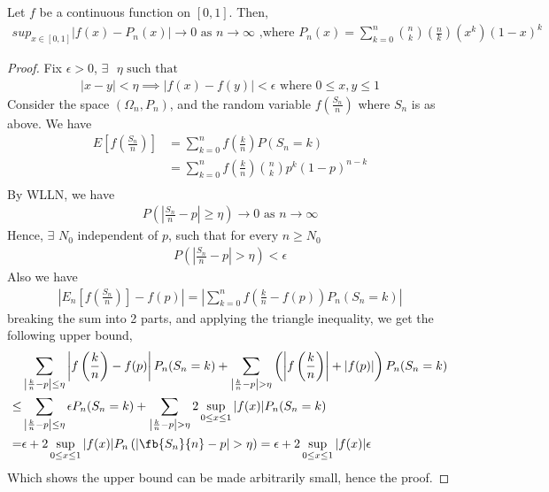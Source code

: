 \begin{lemma}
    Let $f$ be a continuous function on $[0,1]$. Then,
    \begin{align}
        sup_{x \in [0,1]}|f(x)-P_n(x)| \to 0 \text{ as } n \to \infty \text{ ,where } P_n(x)=\sum_{k=0}^{n}\binom{n}{k}\left(\frac{n}{k}\right)(x^k)(1-x)^k
    \end{align}
\end{lemma}
\begin{proof}
    Fix $\epsilon>0$, $\exists \text{ } \eta \text{ such that }$
    \begin{align}
        |x-y| < \eta \implies |f(x)-f(y)| < \epsilon \text{ where } 0 \leq x,y \leq 1
    \end{align}
    Consider the space $(\Omega_n,P_n)$, and the random variable $f\left(\frac{S_n}{n}\right)$ where $S_n$ is as above. 
    We have
    \begin{align*}
        E\left[f\left(\frac{S_n}{n}\right)\right]&=\sum_{k=0}^{n}{f\left(\frac{k}{n}\right)P(S_n=k)} \\
        &=\sum_{k=0}^{n}{f\left(\frac{k}{n}\right)\binom{n}{k}p^k(1-p)^{n-k}} \\
    \end{align*}
    By WLLN, we have
    \begin{align}
        P\left(\left|\frac{S_n}{n}-p\right| \geq \eta\right) \to 0 \text{ as } n \to \infty
    \end{align}
    Hence, $\exists$ $N_0$ independent of $p$, such that for every $n \geq N_0$
    \begin{align}
        P\left(\left|\frac{S_n}{n}-p\right| > \eta\right) < \epsilon
    \end{align}
    Also we have
    \begin{align*}
        \left|E_n\left[f\left(\frac{S_n}{n}\right)\right]-f(p)\right| = \left|\sum_{k=0}^{n}{f\left(\frac{k}{n}-f(p)\right)P_n(S_n=k)}\right|
    \end{align*}
    breaking the sum into 2 parts, and applying the triangle inequality, we get the following upper bound,
    \begin{align*}
        &\sum_{\left| \frac{k}{n} - p \right| \leq \eta} \left| f \left( \frac{k}{n} \right) - f(p) \right| P_n(S_n = k)+ \sum_{\left| \frac{k}{n} - p \right| > \eta} \left( \left| f \left( \frac{k}{n} \right) \right| + |f(p)| \right) P_n(S_n = k)\\
        \leq & \sum_{\left| \frac{k}{n} - p \right| \leq \eta} \epsilon P_n(S_n = k) + \sum_{\left| \frac{k}{n} - p \right| > \eta} 2 \sup_{0 \leq x \leq 1} |f(x)| P_n(S_n = k)\\
        = & \epsilon + 2 \sup_{0 \leq x \leq 1} |f(x)| P_n\left(\left|\fb{S_n}{n} - p \right| >  \eta\right)
        = \epsilon + 2 \sup_{0 \leq x \leq 1} |f(x)| \epsilon
    \end{align*}
    Which shows the upper bound can be made arbitrarily small, hence the proof.
\end{proof}